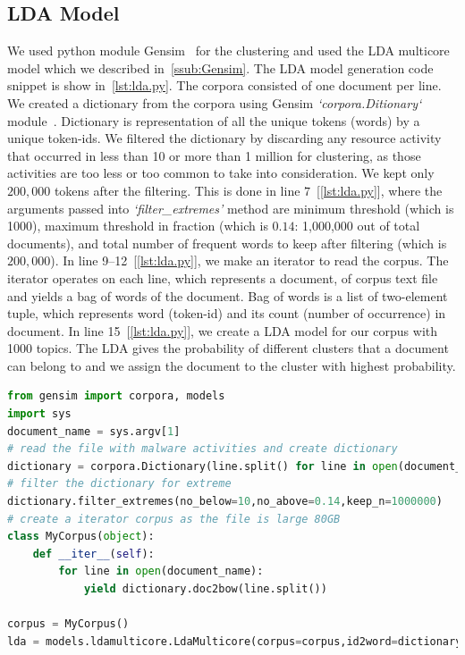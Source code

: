 \subsection{LDA Model}
\label{sub:LDA Model}
We used python module Gensim~\cite[Gensim]{gensim}  for the clustering and used the LDA multicore model which we described in~\autoref{ssub:Gensim}.
The LDA model generation code snippet is show in~\autoref{lst:lda.py}.
The corpora consisted of one document per line.
We created a dictionary from the corpora using Gensim \emph{`corpora.Ditionary`} module~\cite[]{gensimdict}.
Dictionary is representation of all the unique tokens (words) by a unique token-ids.
We filtered the dictionary by discarding any resource activity that occurred in less than 10 or more than 1 million for clustering, as those activities are too less or too common to take into consideration.
We kept only $200,000$ tokens after the filtering.
This is done in line $7$~[\autoref{lst:lda.py}], where the arguments passed into \emph{`filter\_extremes'} method are minimum threshold (which is 1000), maximum threshold in fraction (which is $0.14$: 1,000,000 out of total \gettotalmalwareiii{} documents), and total number of frequent words to keep after filtering (which is $200,000$).
In line 9--12~[\autoref{lst:lda.py}], we make an iterator to read the corpus.
The iterator operates on each line, which represents a document, of corpus text file and yields a bag of words of the document.
Bag of words is a list of two-element tuple, which represents word (token-id) and its count (number of occurrence) in document.
In line 15~[\autoref{lst:lda.py}], we create a LDA model for our corpus with 1000 topics.
The LDA gives the probability of different clusters that a document can belong to and we assign the document to the cluster with highest probability.\\
\begin{lstlisting}[float,floatplacement=H,language=python,caption={Script to run Gensim LDA},label={lst:lda.py}]
from gensim import corpora, models
import sys
document_name = sys.argv[1]
# read the file with malware activities and create dictionary
dictionary = corpora.Dictionary(line.split() for line in open(document_name))
# filter the dictionary for extreme
dictionary.filter_extremes(no_below=10,no_above=0.14,keep_n=1000000)
# create a iterator corpus as the file is large 80GB
class MyCorpus(object):
    def __iter__(self):
        for line in open(document_name):
            yield dictionary.doc2bow(line.split())

corpus = MyCorpus()
lda = models.ldamulticore.LdaMulticore(corpus=corpus,id2word=dictionary,num_topics=1000)
\end{lstlisting}

